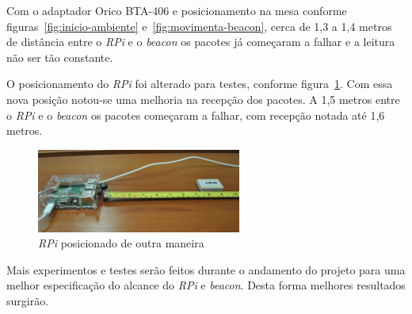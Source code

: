 \documentclass[
		12pt,				%
		openright,			%
		oneside,			%
		a4paper,			%
		chapter=TITLE,		%
		english,			%
		brazil				%
	]{abntex2}
\begin{document}
Com o adaptador Orico BTA-406 e posicionamento na mesa conforme figuras~\ref{fig:inicio-ambiente} e~\ref{fig:movimenta-beacon}, cerca de 1,3 a 1,4 metros de distância entre o \textit{RPi} e o \textit{beacon} os pacotes já começaram a falhar e a leitura não ser tão constante.

O posicionamento do \textit{RPi} foi alterado para testes, conforme figura~\ref{fig:posiciona-rpi}. Com essa nova posição notou-se uma melhoria na recepção dos pacotes. A 1,5 metros entre o \textit{RPi} e o \textit{beacon} os pacotes começaram a falhar, com recepção notada até 1,6 metros.

\begin{figure}[htb]
	\caption{\label{fig:posiciona-rpi}\textit{RPi} posicionado de outra maneira}
	\begin{center}
		\includegraphics[width=0.6\textwidth]{img/ambiente2.jpg}
	\end{center}
\end{figure}

Mais experimentos e testes serão feitos durante o andamento do projeto para uma melhor especificação do alcance do \textit{RPi} e \textit{beacon}. Desta forma melhores resultados surgirão.


\end{document}
